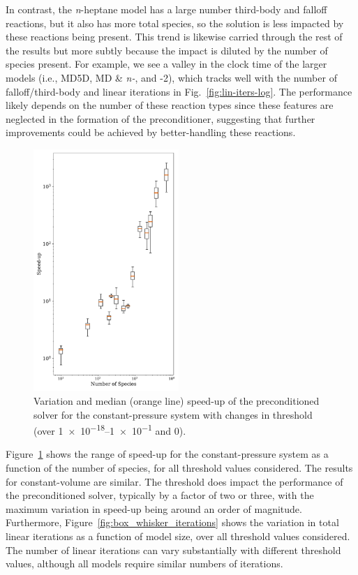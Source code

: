 \documentclass[twocolumn,10pt]{article}
\newcommand{\revised}[2]{#1}  %
\begin{document}
In contrast, the \textit{n}-heptane model has a large number third-body and falloff reactions, but it also has more total species, so the solution is less impacted by these reactions being present.
This trend is likewise carried through the rest of the results but more subtly because the impact is diluted by the number of species present.
For example, we see a valley in the clock time of the larger models (i.e., MD5D, MD \& \textit{n-}, and -2), which tracks well with the number of falloff/third-body and linear iterations in Fig.~\ref{fig:lin-iters-log}.
The performance likely depends on the number of these reaction types since these features are neglected in the formation of the preconditioner, suggesting that further improvements could be achieved by better-handling these reactions.

\begin{figure}[htb]
\centering
\includegraphics[width=0.49\textwidth]{figures/Threshold-BoxWhisker-pressure_problem.pdf}
\caption{Variation and median (orange line) speed-up of the preconditioned solver for the constant-pressure system with changes in threshold (over \numrange{1e-18}{1e-1} and 0).}
\label{fig:box_whisker}
\end{figure}


\revised{Figure~\ref{fig:box_whisker} shows the range of speed-up for the constant-pressure system as a function of the number of species, for all  threshold values considered. 
The results for constant-volume are similar.
The threshold does impact the performance of the preconditioned solver, typically by a factor of two or three, with the maximum variation in speed-up being around an order of magnitude. 
Furthermore, Figure~\ref{fig:box_whisker_iterations} shows the variation in total linear iterations as a function of model size, over all threshold values considered.
The number of linear iterations can vary substantially with different threshold values, although all models require similar numbers of iterations.}{revOne} 
\end{document}
